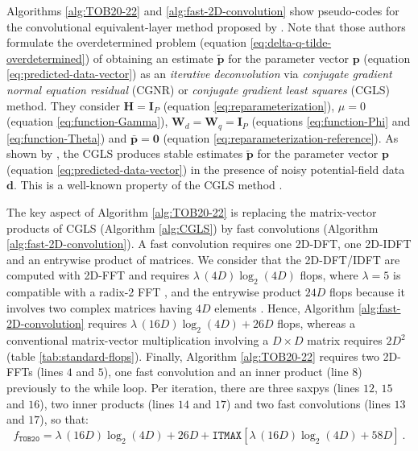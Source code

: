 \documentclass[utf8]{FrontiersinHarvard} %
\begin{document}
	Algorithms \ref{alg:TOB20-22} and \ref{alg:fast-2D-convolution} show pseudo-codes for the convolutional equivalent-layer 
	method proposed by \citet{takahashi-etal2020, takahashi-etal2022}.
	Note that those authors formulate the overdetermined problem (equation \ref{eq:delta-q-tilde-overdetermined}) of obtaining 
	an estimate $\tilde{\mathbf{p}}$ for the parameter vector $\mathbf{p}$ (equation \ref{eq:predicted-data-vector}) as an \textit{iterative deconvolution} via 
	\textit{conjugate gradient normal equation residual} (CGNR) \citet[][sec. 11.3]{golub-vanloan2013} or \textit{conjugate gradient least squares} (CGLS) 
	\cite[][p. 165]{aster_etal2019} method. 
	They consider $\mathbf{H} = \mathbf{I}_{P}$ (equation \ref{eq:reparameterization}), 
	$\mu = 0$ (equation \ref{eq:function-Gamma}), 
	$\mathbf{W}_{d} = \mathbf{W}_{q} = \mathbf{I}_{P}$ (equations \ref{eq:function-Phi} and \ref{eq:function-Theta})
	and $\bar{\mathbf{p}} = \mathbf{0}$ (equation \ref{eq:reparameterization-reference}).
	As shown by \citet{takahashi-etal2020, takahashi-etal2022}, the CGLS produces stable estimates $\tilde{\mathbf{p}}$ for the
	parameter vector $\mathbf{p}$ (equation \ref{eq:predicted-data-vector}) in the presence of 
	noisy potential-field data $\mathbf{d}$. This is a well-known property of the CGLS method \citep[e.g.,][p. 166]{aster_etal2019}.
	
	The key aspect of Algorithm \ref{alg:TOB20-22} is replacing the matrix-vector products of CGLS (Algorithm \ref{alg:CGLS})
	by fast convolutions (Algorithm \ref{alg:fast-2D-convolution}).
	A fast convolution requires one 2D-DFT, one 2D-IDFT and an entrywise product of matrices.
	We consider that the 2D-DFT/IDFT are computed with 2D-FFT and requires $\lambda \, (4D)\log_{2}(4D)$ flops, 
	where $\lambda = 5$ is compatible with a radix-2 FFT 
	\citep[][p. 16]{vanloan1992}, and the entrywise product $24D$ flops because it involves two complex matrices having $4D$ elements
	\citep[][p. 36]{golub-vanloan2013}.
	Hence, Algorithm \ref{alg:fast-2D-convolution} requires $\lambda \, (16D)\log_{2}(4D) + 26D$ flops,
	whereas a conventional matrix-vector multiplication involving a $D \times D$ matrix requires $2D^{2}$ (table \ref{tab:standard-flops}).
	Finally, Algorithm \ref{alg:TOB20-22} requires two 2D-FFTs (lines $4$ and $5$), one fast convolution and an inner product (line $8$)
	previously to the while loop.
	Per iteration, there are three saxpys (lines $12$, $15$ and $16$), two inner products (lines $14$ and $17$) and 
	two fast convolutions (lines $13$ and $17$), so that:
	\begin{equation}
		f_{\mathtt{TOB20}} = \lambda \, (16D)\log_{2}(4D) + 26D + \mathtt{ITMAX} 
		\left[
		\lambda \, (16D)\log_{2}(4D) + 58D
		\right] \: .
		\label{flops:TOB20}
	\end{equation}
	
\end{document}
